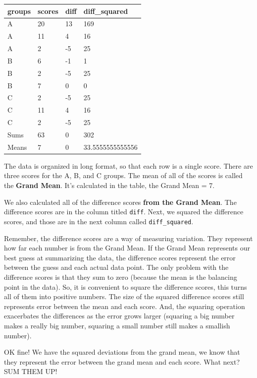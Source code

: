 \documentclass[
  letterpaper,
  DIV=11,
  numbers=noendperiod]{scrreprt}
\begin{document}
\begin{longtable}[]{@{}llll@{}}
\toprule\noalign{}
groups & scores & diff & diff\_squared \\
\midrule\noalign{}
\endhead
\bottomrule\noalign{}
\endlastfoot
A & 20 & 13 & 169 \\
A & 11 & 4 & 16 \\
A & 2 & -5 & 25 \\
B & 6 & -1 & 1 \\
B & 2 & -5 & 25 \\
B & 7 & 0 & 0 \\
C & 2 & -5 & 25 \\
C & 11 & 4 & 16 \\
C & 2 & -5 & 25 \\
Sums & 63 & 0 & 302 \\
Means & 7 & 0 & 33.5555555555556 \\
\end{longtable}

The data is organized in long format, so that each row is a single
score. There are three scores for the A, B, and C groups. The mean of
all of the scores is called the \textbf{Grand Mean}. It's calculated in
the table, the Grand Mean = 7.

We also calculated all of the difference scores \textbf{from the Grand
Mean}. The difference scores are in the column titled \texttt{diff}.
Next, we squared the difference scores, and those are in the next column
called \texttt{diff\_squared}.

Remember, the difference scores are a way of measuring variation. They
represent how far each number is from the Grand Mean. If the Grand Mean
represents our best guess at summarizing the data, the difference scores
represent the error between the guess and each actual data point. The
only problem with the difference scores is that they sum to zero
(because the mean is the balancing point in the data). So, it is
convenient to square the difference scores, this turns all of them into
positive numbers. The size of the squared difference scores still
represents error between the mean and each score. And, the squaring
operation exacerbates the differences as the error grows larger
(squaring a big number makes a really big number, squaring a small
number still makes a smallish number).

OK fine! We have the squared deviations from the grand mean, we know
that they represent the error between the grand mean and each score.
What next? SUM THEM UP!
\end{document}
